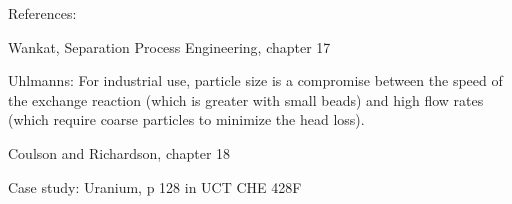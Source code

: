 References:

Wankat, Separation Process Engineering, chapter 17

Uhlmanns: For industrial use, particle size is a compromise between the speed of the exchange reaction (which is greater with small beads) and high flow rates (which require coarse particles to minimize the head loss).


Coulson and Richardson, chapter 18

Case study: Uranium, p 128 in UCT CHE 428F